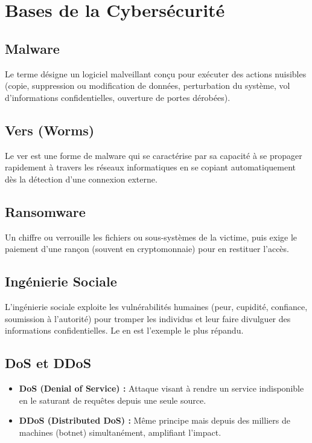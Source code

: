 \section{Bases de la Cybersécurité}

\subsection{Malware}
Le terme  désigne un logiciel malveillant conçu pour exécuter des actions nuisibles (copie, suppression ou modification de données, perturbation du système, vol d'informations confidentielles, ouverture de portes dérobées).

\subsection{Vers (Worms)}
Le ver est une forme de malware qui se caractérise par sa capacité à se propager rapidement à travers les réseaux informatiques en se copiant automatiquement dès la détection d'une connexion externe.

\subsection{Ransomware}
Un  chiffre ou verrouille les fichiers ou sous-systèmes de la victime, puis exige le paiement d'une rançon (souvent en cryptomonnaie) pour en restituer l'accès.

\subsection{Ingénierie Sociale}
L'ingénierie sociale exploite les vulnérabilités humaines (peur, cupidité, confiance, soumission à l'autorité) pour tromper les individus et leur faire divulguer des informations confidentielles. Le  en est l'exemple le plus répandu.

\subsection{DoS et DDoS}
\begin{itemize}
    \item \textbf{DoS (Denial of Service) :} Attaque visant à rendre un service indisponible en le saturant de requêtes depuis une seule source.
    \item \textbf{DDoS (Distributed DoS) :} Même principe mais depuis des milliers de machines (botnet) simultanément, amplifiant l'impact.
\end{itemize}

